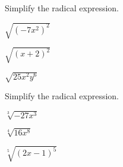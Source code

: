 \begin{exercise}Simplify the radical expression.\\
	\begin{enumerate*}[label={(\arabic*)~}]
		\item $\sqrt{(-7x^2)^2}$
		\item $\sqrt{(x+2)^2}$
		\item $\sqrt{25x^2y^6}$
		\hspace*{\fill}\null
	\end{enumerate*}
\end{exercise}


\vfill
\begin{center} \hfill
\end{center}


\begin{exercise}Simplify the radical expression.\\
	\begin{enumerate*}[label={(\arabic*)~}]
		\item $\sqrt[3]{-27x^3}$
		\item $\sqrt[4]{16x^8}$
		\item $\sqrt[5]{(2x-1)^5}$
		\hspace*{\fill}\null
	\end{enumerate*}
\end{exercise}


